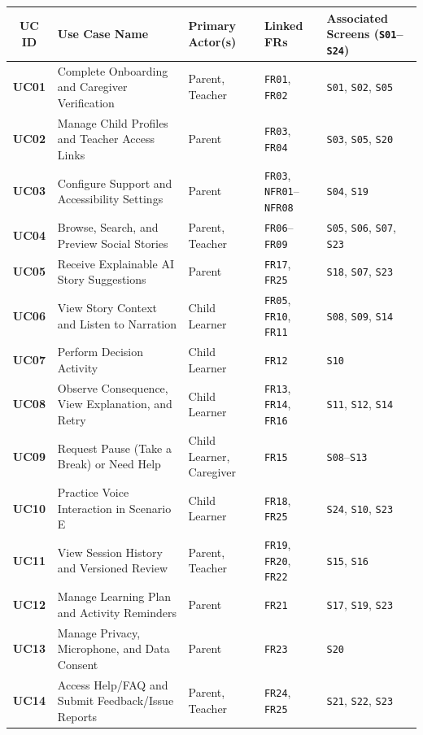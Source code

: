 \begin{footnotesize}
\noindent\begin{xltabular}{\textwidth}{|c|p{2.2cm}|X|p{2.0cm}|p{2.4cm}|}
\hline
\textbf{UC ID} & \textbf{Use Case Name} & \textbf{Primary Actor(s)} & \textbf{Linked FRs} & \textbf{Associated Screens (\texttt{S01}–\texttt{S24})} \\ \hline
\endhead
\textbf{UC01} & Complete Onboarding and Caregiver Verification & Parent, Teacher & \texttt{FR01}, \texttt{FR02} & \texttt{S01}, \texttt{S02}, \texttt{S05} \\ \hline
\textbf{UC02} & Manage Child Profiles and Teacher Access Links & Parent & \texttt{FR03}, \texttt{FR04} & \texttt{S03}, \texttt{S05}, \texttt{S20} \\ \hline
\textbf{UC03} & Configure Support and Accessibility Settings & Parent & \texttt{FR03}, \texttt{NFR01}–\texttt{NFR08} & \texttt{S04}, \texttt{S19} \\ \hline
\textbf{UC04} & Browse, Search, and Preview Social Stories & Parent, Teacher & \texttt{FR06}–\texttt{FR09} & \texttt{S05}, \texttt{S06}, \texttt{S07}, \texttt{S23} \\ \hline
\textbf{UC05} & Receive Explainable AI Story Suggestions & Parent & \texttt{FR17}, \texttt{FR25} & \texttt{S18}, \texttt{S07}, \texttt{S23} \\ \hline
\textbf{UC06} & View Story Context and Listen to Narration & Child Learner & \texttt{FR05}, \texttt{FR10}, \texttt{FR11} & \texttt{S08}, \texttt{S09}, \texttt{S14} \\ \hline
\textbf{UC07} & Perform Decision Activity & Child Learner & \texttt{FR12} & \texttt{S10} \\ \hline
\textbf{UC08} & Observe Consequence, View Explanation, and Retry & Child Learner & \texttt{FR13}, \texttt{FR14}, \texttt{FR16} & \texttt{S11}, \texttt{S12}, \texttt{S14} \\ \hline
\textbf{UC09} & Request Pause (Take a Break) or Need Help & Child Learner, Caregiver & \texttt{FR15} & \texttt{S08}–\texttt{S13} \\ \hline
\textbf{UC10} & Practice Voice Interaction in Scenario E & Child Learner & \texttt{FR18}, \texttt{FR25} & \texttt{S24}, \texttt{S10}, \texttt{S23} \\ \hline
\textbf{UC11} & View Session History and Versioned Review & Parent, Teacher & \texttt{FR19}, \texttt{FR20}, \texttt{FR22} & \texttt{S15}, \texttt{S16} \\ \hline
\textbf{UC12} & Manage Learning Plan and Activity Reminders & Parent & \texttt{FR21} & \texttt{S17}, \texttt{S19}, \texttt{S23} \\ \hline
\textbf{UC13} & Manage Privacy, Microphone, and Data Consent & Parent & \texttt{FR23} & \texttt{S20} \\ \hline
\textbf{UC14} & Access Help/FAQ and Submit Feedback/Issue Reports & Parent, Teacher & \texttt{FR24}, \texttt{FR25} & \texttt{S21}, \texttt{S22}, \texttt{S23} \\ \hline
\end{xltabular}
\end{footnotesize}



